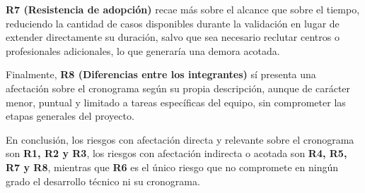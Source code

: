             \textbf{R7 (Resistencia de adopción)} recae más sobre el alcance que sobre el tiempo, reduciendo la cantidad de casos disponibles durante la validación en lugar de extender directamente su duración, salvo que sea necesario reclutar centros o profesionales adicionales, lo que generaría una demora acotada. 
            
            Finalmente, \textbf{R8 (Diferencias entre los integrantes)} sí presenta una afectación sobre el cronograma según su propia descripción, aunque de carácter menor, puntual y limitado a tareas específicas del equipo, sin comprometer las etapas generales del proyecto.

            En conclusión, los riesgos con afectación directa y relevante sobre el cronograma son \textbf{R1, R2 y R3}, los riesgos con afectación indirecta o acotada son \textbf{R4, R5, R7 y R8}, mientras que \textbf{R6} es el único riesgo que no compromete en ningún grado el desarrollo técnico ni su cronograma.